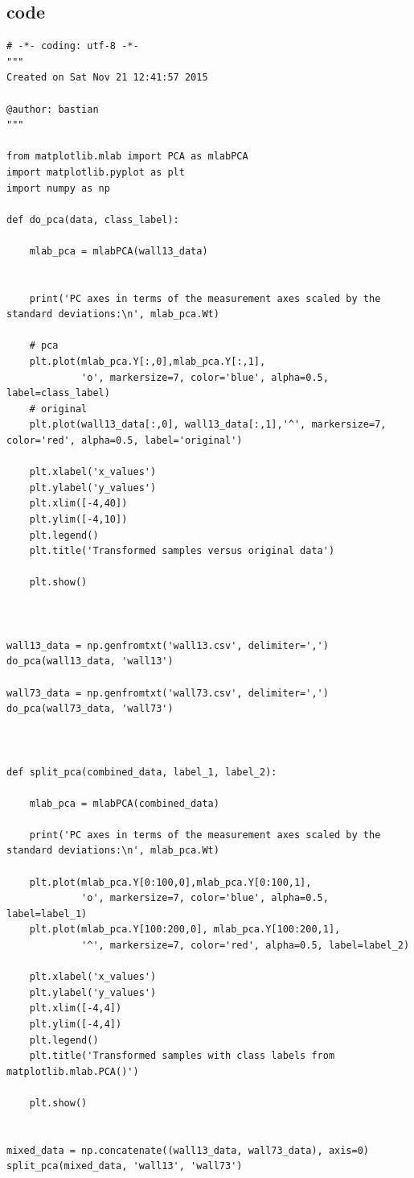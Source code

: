 \documentclass[paper=a4, fontsize=11pt]{scrartcl} %
\numberwithin{equation}{section} %
\numberwithin{figure}{section} %
\numberwithin{table}{section} %
\begin{document}
\subsection{code}
\begin{lstlisting}
# -*- coding: utf-8 -*-
"""
Created on Sat Nov 21 12:41:57 2015

@author: bastian
"""

from matplotlib.mlab import PCA as mlabPCA
import matplotlib.pyplot as plt
import numpy as np

def do_pca(data, class_label):
    
    mlab_pca = mlabPCA(wall13_data)
    
    
    print('PC axes in terms of the measurement axes scaled by the standard deviations:\n', mlab_pca.Wt)
    
    # pca
    plt.plot(mlab_pca.Y[:,0],mlab_pca.Y[:,1],
             'o', markersize=7, color='blue', alpha=0.5, label=class_label)
    # original
    plt.plot(wall13_data[:,0], wall13_data[:,1],'^', markersize=7, color='red', alpha=0.5, label='original')
    
    plt.xlabel('x_values')
    plt.ylabel('y_values')
    plt.xlim([-4,40])
    plt.ylim([-4,10])
    plt.legend()
    plt.title('Transformed samples versus original data')
    
    plt.show()



wall13_data = np.genfromtxt('wall13.csv', delimiter=',')
do_pca(wall13_data, 'wall13')

wall73_data = np.genfromtxt('wall73.csv', delimiter=',')
do_pca(wall73_data, 'wall73') 



def split_pca(combined_data, label_1, label_2):
    
    mlab_pca = mlabPCA(combined_data)
    
    print('PC axes in terms of the measurement axes scaled by the standard deviations:\n', mlab_pca.Wt)
    
    plt.plot(mlab_pca.Y[0:100,0],mlab_pca.Y[0:100,1],
             'o', markersize=7, color='blue', alpha=0.5, label=label_1)
    plt.plot(mlab_pca.Y[100:200,0], mlab_pca.Y[100:200,1],
             '^', markersize=7, color='red', alpha=0.5, label=label_2)
    
    plt.xlabel('x_values')
    plt.ylabel('y_values')
    plt.xlim([-4,4])
    plt.ylim([-4,4])
    plt.legend()
    plt.title('Transformed samples with class labels from matplotlib.mlab.PCA()')
    
    plt.show()
    

mixed_data = np.concatenate((wall13_data, wall73_data), axis=0)
split_pca(mixed_data, 'wall13', 'wall73')
\end{lstlisting}
\end{document}
